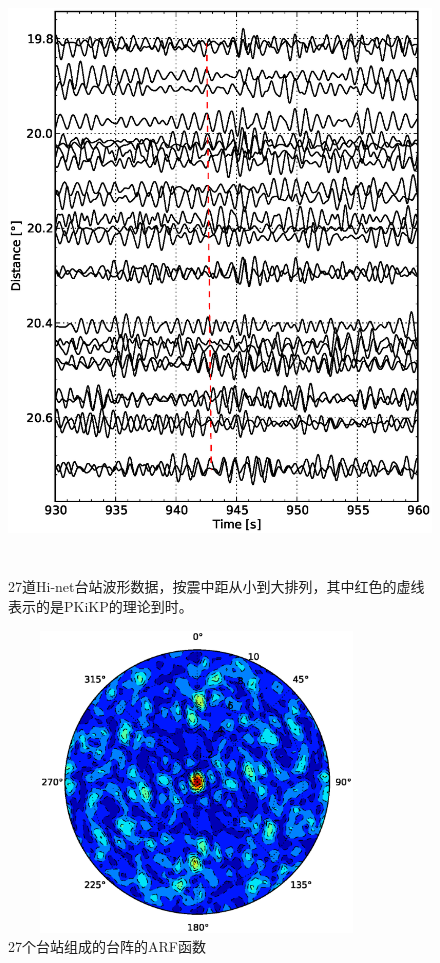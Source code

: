 \begin{figure}[tbph]
\centering
\includegraphics[width=12cm,height=16cm]{fig/chap2/section.eps}
\caption{27道Hi-net台站波形数据，按震中距从小到大排列，其中红色的虚线表示的是PKiKP的理论到时。}
\label{section}
\end{figure}

\begin{figure}
\centering
\includegraphics[width=10cm,height=8cm]{fig/chap2/arf_hinet.eps}
\caption{27个台站组成的台阵的ARF函数}
\end{figure}